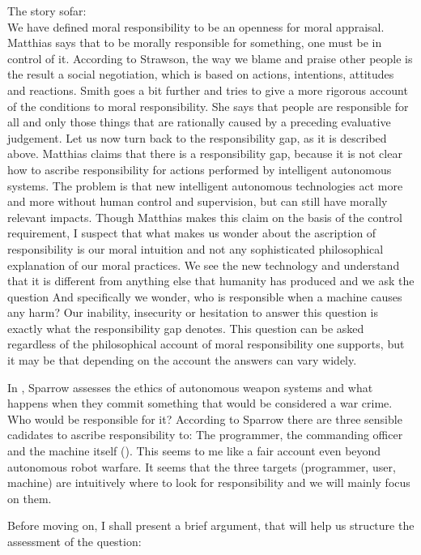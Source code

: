 \documentclass{article}
\begin{document}
The story sofar:\\
We have defined moral responsibility to be an openness for moral appraisal.
Matthias says that to be morally responsible for something, one must be in
control of it. According to Strawson, the way we blame and praise other people
is the result a social negotiation, which is based on actions, intentions, attitudes and
reactions. Smith goes a bit further and tries to give a more rigorous account of
the conditions to moral responsibility. She says that people are responsible for all and only those things that are rationally caused by a preceding evaluative
judgement. Let us now turn back to the responsibility gap, as it is described
above. Matthias claims that there is a responsibility gap, because it is not
clear how to ascribe responsibility for actions performed by intelligent
autonomous systems. The problem is that new intelligent autonomous technologies
act more and more without human control and supervision, but can still have
morally relevant impacts. Though Matthias makes this claim on the basis of the
control requirement, I suspect that what makes us wonder about the
ascription of responsibility is our moral intuition and not any sophisticated
philosophical explanation of our moral practices. We see the new technology and
understand that it is different from anything else that humanity has produced
and we ask the question  And specifically we
wonder, who is responsible when a machine causes any harm?
Our inability, insecurity or hesitation to answer this question is exactly what
the responsibility gap denotes.
This question can be asked regardless of the philosophical account of moral
responsibility one supports, but it may be that depending on the account the
answers can vary widely.

In , Sparrow assesses the ethics of
autonomous weapon systems and what happens when they commit something that would
be considered a war crime. Who would be responsible for it? According to Sparrow
there are three sensible cadidates to ascribe responsibility to: The programmer,
the commanding officer and the machine itself (\cite[p.
69-71]{sparrow2007killer}). This seems to me like a fair
account even beyond autonomous robot warfare. It seems that the three targets
(programmer, user, machine) are intuitively where to look for responsibility and
we will mainly focus on them.


Before moving on, I shall present a brief argument, that will help us structure
the assessment of the question:
\end{document}
